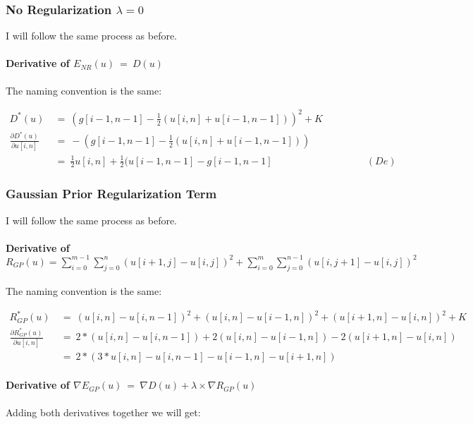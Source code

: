 \documentclass{report}
\begin{document}
			\subsubsection{No Regularization $\lambda = 0$}
			\startsubsection
				I will follow the same process as before.
				\vspace{-0.4cm} \paragraph{Derivative of  $E_{NR}(u) \ = \ D(u)$}
				\startsubsection
					The naming convention is the same:
				\closesection
				\begin{adjustwidth}{-6em}{}
					\vspace{-0.6cm}
					\begin{align*}
						D^*(u) \ & = \ (g[i-1,n-1] - \frac{1}{2} (u[i,n] + u[i-1,n-1]))^2 + K \\
						\frac{\partial D^*(u)}{\partial u[i,n]} \ & = \ - (g[i-1,n-1] - \frac{1}{2} (u[i,n] + u[i-1,n-1])) \\
						& = \ \frac{1}{2} u[i,n]  + \frac{1}{2} (u[i-1,n-1] - g[i-1,n-1] \hspace{4cm} (De)
					\end{align*}
				\end{adjustwidth}
			\closesection
			\subsubsection{Gaussian Prior Regularization Term}
			\startsubsection
				I will follow the same process as before.
				\vspace{-0.4cm} \paragraph{Derivative of $R_{GP}(u) = \sum_{i=0}^{m-1} \sum_{j=0}^{n} ( u[i+1,j] - u[i,j] )^2 + \sum_{i=0}^{m} \sum_{j=0}^{n-1} ( u[i,j+1] - u[i,j] )^2$}
				\startsubsection
					\vspace{0.2cm} The naming convention is the same:
				\closesection
				\begin{adjustwidth}{-4em}{}
					\vspace{-0.5cm}
					\begin{align*}
						R_{GP}^*(u) \ & = \ (u[i,n] - u[i,n-1])^2 + (u[i,n] - u[i-1,n])^2 + (u[i+1,n] - u[i,n])^2 + K \\
						\frac{\partial R_{GP}^*(u)}{\partial u[i,n]} \ & = \ 2 * (u[i,n] - u[i,n-1]) + 2 (u[i,n] - u[i-1,n]) - 2 (u[i+1,n] - u[i,n]) \\
						& = \ 2 * (3 * u[i,n] - u[i,n-1] - u[i-1,n] - u[i+1,n])
					\end{align*}
				\end{adjustwidth}
				\vspace{-0.4cm} \paragraph{Derivative of $\nabla E_{GP}(u) \ = \ \nabla D(u) + \lambda \times \nabla R_{GP}(u)$}
				\startsubsection
					Adding both derivatives together we will get:
				\closesection
			\closesection
\end{document}
